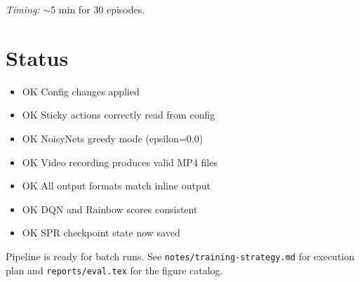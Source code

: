 \documentclass[11pt]{article}
\newcommand{\ok}{\textcolor{green!60!black}{OK}}
\begin{document}
\noindent\textit{Timing:} $\sim$5 min for 30 episodes.


\section{Status}

\begin{itemize}[leftmargin=2em, itemsep=0.3em]
  \item \ok{} Config changes applied
  \item \ok{} Sticky actions correctly read from config
  \item \ok{} NoisyNets greedy mode (epsilon=0.0)
  \item \ok{} Video recording produces valid MP4 files
  \item \ok{} All output formats match inline output
  \item \ok{} DQN and Rainbow scores consistent
  \item \ok{} SPR checkpoint state now saved
\end{itemize}

Pipeline is ready for batch runs. See
\texttt{notes/training-strategy.md} for execution plan and
\texttt{reports/eval.tex} for the figure catalog.
\end{document}
